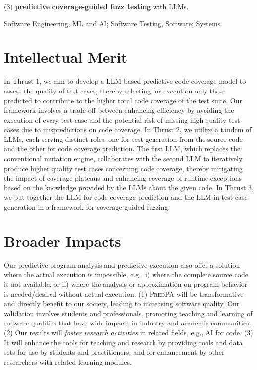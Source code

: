 \documentclass[11pt]{article}
\newcommand{\tool}{\textsc{PredPA}\xspace}
\begin{document}
(3) {\bf predictive coverage-guided fuzz testing} with LLMs.



 Software Engineering, ML and AI; Software Testing, Software; Systems.

\section{Intellectual Merit}

In Thrust 1, we aim to develop a LLM-based predictive code coverage
model to assess the quality of test cases, thereby selecting for
execution only those predicted to contribute to the higher total code
coverage of the test suite. Our framework involves a trade-off between
enhancing efficiency by avoiding the execution of every test case and
the potential risk of missing high-quality test cases due to
mispredictions on code coverage. In Thrust 2, we utilize a tandem of
LLMs, each serving distinct roles: one for test generation from the
source code and the other for code coverage prediction. The first LLM,
which replaces the conventional mutation engine, collaborates with the
second LLM to iteratively produce higher quality test cases concerning
code coverage, thereby mitigating the impact of coverage plateaus and
enhancing coverage of runtime exceptions based on the knowledge
provided by the LLMs about the given code.  In Thrust 3, we put
together the LLM for code coverage prediction and the LLM in test case
generation in a framework for coverage-guided fuzzing.

\section{Broader Impacts}


Our predictive program analysis and predictive execution also offer a
solution where the actual execution is impossible, e.g., i) where the complete source code is
not available, or ii) where the analysis or approximation on
program behavior is needed/desired without actual execution. (1)
{\tool} will be transformative and directly benefit to our
  society, leading to increasing software quality.  Our validation
involves students and professionals, promoting teaching and learning
of software qualities that have wide impacts in industry and academic
communities. (2) Our results will {\em foster research activities} in
related fields, e.g., AI for code. (3) It will
enhance the tools for teaching and research by providing tools and
data sets for use by students and practitioners, and for enhancement
by other researchers with related learning modules.
\end{document}
